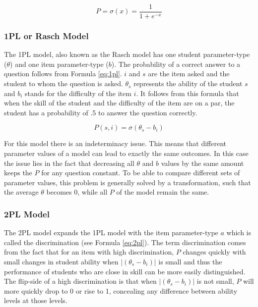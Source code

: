 \documentclass{scrartcl}
\begin{document}
\begin{equation}
\label{eq:logistic}
P = \sigma(x) = \frac{1}{1+e^{-x}}
\end{equation}

\subsubsection{1PL or Rasch Model}
\label{sec:1PL}
The 1PL model, also known as the Rasch model has one student parameter-type ($\theta$) and one item parameter-type ($b$). The probability of a correct answer to a question follows from Formula \ref{eq:1pl}. $i$ and $s$ are the item asked and the student to whom the question is asked. $\theta_{s}$ represents the ability of the student $s$ and $b_{i}$ stands for the difficulty of the item $i$. It follows from this formula that when the skill of the student and the difficulty of the item are on a par, the student has a probability of .5 to answer the question correctly. 

\begin{equation}
\label{eq:1pl}
P(s,i) = \sigma(\theta_{s} - b_{i})
\end{equation}

For this model there is an indeterminacy issue. This means that different parameter values of a model can lead to exactly the same outcomes. In this case the issue lies in the fact that decreasing all $\theta$ and $b$ values by the same amount keeps the $P$ for any question constant. To be able to compare different sets of parameter values, this problem is generally solved by a transformation, such that the average $\theta$ becomes 0, while all $P$ of the model remain the same.

\subsubsection{2PL Model}
The 2PL model expands the 1PL model with the item parameter-type $a$ which is called the discrimination (see Formula \ref{eq:2pl}). The term discrimination comes from the fact that for an item with high discrimination, $P$ changes quickly with small changes in student ability when $|(\theta_{s} - b_{i})|$ is small and thus the performance of students who are close in skill can be more easily distinguished. The flip-side of a high discrimination is that when $|(\theta_{s} - b_{i})|$ is not small, $P$ will more quickly drop to 0 or rise to 1, concealing any difference between ability levels at those levels. 
\end{document}
